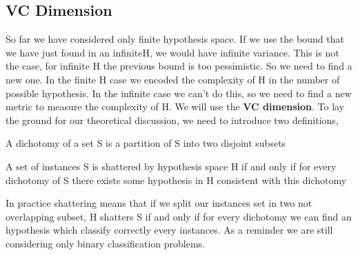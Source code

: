 \documentclass[../main.tex]{subfiles}
\begin{document}
\subsection{VC Dimension}
So far we have considered only finite hypothesis space. If we use the bound that we have just found in an infinite\footnotemark H, we would have infinite variance. This is not the case, for infinite H the previous bound is too pessimistic. So we need to find a new one. In the finite H case we encoded the complexity of H in the number of possible hypothesis. In the infinite case we can't do this, so we need to find a new metric to measure the complexity of H. We will use the \textbf{VC dimension}. To lay the ground for our theoretical discussion, we need to introduce two definitions,
\begin{definition}[Dichotomy]
    A dichotomy of a set S is a partition of S into two disjoint subsets
\end{definition}
\begin{definition}[Shattering]
    A set of instances S is shattered by hypothesis space H if and only if for
    every dichotomy of S there exists some hypothesis in H consistent with this
    dichotomy
\end{definition}
In practice shattering means that if we split our instances set in two not overlapping subset, H shatters S if and only if for every dichotomy we can find an hypothesis which classify correctly every instances. As a reminder we are still considering only binary classification problems.
\end{document}
